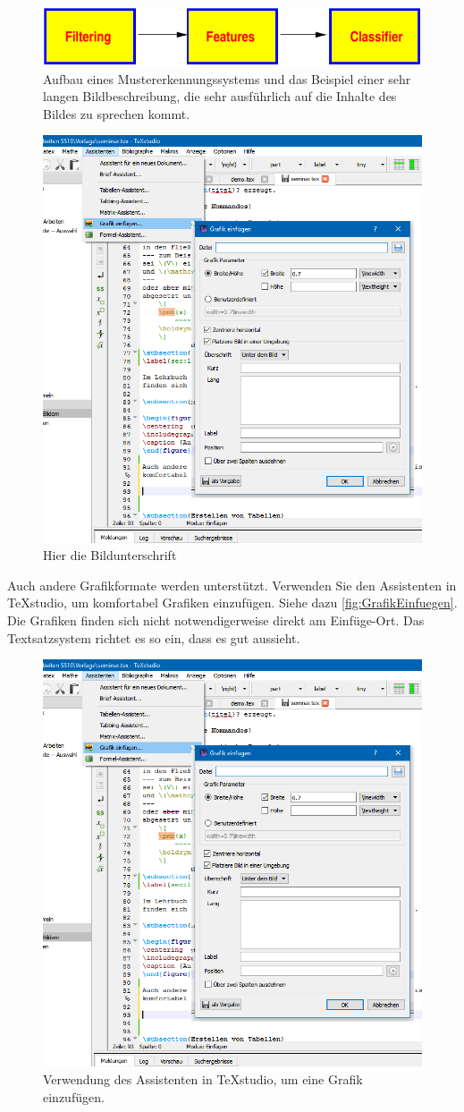 \begin{figure}
\centering
\includegraphics [width=0.5\linewidth] {bilder/bildchen.pdf}
\caption [Aufbau eines Mustererkennungssystems]{Aufbau eines Mustererkennungssystems und das Beispiel einer sehr langen Bildbeschreibung, die sehr ausführlich auf die Inhalte des Bildes zu sprechen kommt. \autocite{Oechsner2015}}
\label{fig:AufbauMustererkennungssystem}
\end{figure}

\begin{figure}
    \centering
    \includegraphics[width=0.5\linewidth] {bilder/GrafikEinfuegen.png}
    \caption{Hier die Bildunterschrift}
    \label{fig:my_label}
\end{figure}

Auch andere Grafikformate werden unterstützt. Verwenden Sie den Assistenten in TeXstudio, um komfortabel Grafiken einzufügen. Siehe dazu \autoref{fig:GrafikEinfuegen}. Die Grafiken finden sich nicht notwendigerweise direkt am Einfüge-Ort. Das Textsatzsystem richtet es so ein, dass es gut aussieht.

\begin{figure}
\centering
\includegraphics[width=0.7\linewidth]{bilder/GrafikEinfuegen}
\caption{Verwendung des Assistenten in \TeX studio, um eine Grafik einzufügen.}
\label{fig:GrafikEinfuegen}
\end{figure}

